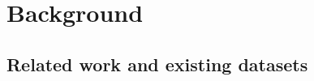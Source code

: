 \section{Background}\label{Sec:background}

%
%
%




\subsection{Related work and existing datasets}

